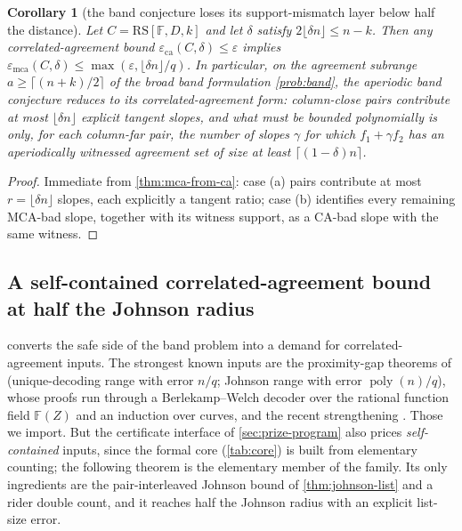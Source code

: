 \documentclass[11pt]{article}
\newtheorem{corollary}[corollary]{Corollary}
\theoremstyle{definition}
\theoremstyle{remark}
\newcommand{\F}{\mathbb{F}}
\newcommand{\RS}{\mathrm{RS}}
\newcommand{\eca}{\varepsilon_{\mathrm{ca}}}
\newcommand{\emca}{\varepsilon_{\mathrm{mca}}}
\begin{document}
\begin{corollary}[the band conjecture loses its support-mismatch layer below half the distance]\label{cor:band-reduction}
Let $C=\RS[\F,D,k]$ and let $\delta$ satisfy $2\lfloor\delta n\rfloor\le n-k$. Then any correlated-agreement bound $\eca(C,\delta)\le\varepsilon$ implies $\emca(C,\delta)\le\max(\varepsilon,\lfloor\delta n\rfloor/q)$. In particular, on the agreement subrange $a\ge\lceil(n+k)/2\rceil$ of the broad band formulation \cref{prob:band}, the aperiodic band conjecture reduces to its correlated-agreement form: column-close pairs contribute at most $\lfloor\delta n\rfloor$ explicit tangent slopes, and what must be bounded polynomially is only, for each column-far pair, the number of slopes $\gamma$ for which $f_1+\gamma f_2$ has an aperiodically witnessed agreement set of size at least $\lceil(1-\delta)n\rceil$.
\end{corollary}

\begin{proof}
Immediate from \cref{thm:mca-from-ca}: case \textup{(a)} pairs contribute at most $r=\lfloor\delta n\rfloor$ slopes, each explicitly a tangent ratio; case \textup{(b)} identifies every remaining MCA-bad slope, together with its witness support, as a CA-bad slope with the same witness.
\end{proof}

\subsection{A self-contained correlated-agreement bound at half the Johnson radius}\label{sec:pincer-ca}

 converts the safe side of the band problem into a demand for correlated-agreement inputs. The strongest known inputs are the proximity-gap theorems of \cite{BCIKS20} (unique-decoding range with error $n/q$; Johnson range with error $\operatorname{poly}(n)/q$), whose proofs run through a Berlekamp--Welch decoder over the rational function field $\F(Z)$ and an induction over curves, and the recent strengthening \cite{BCHKS25}. Those we import. But the certificate interface of \cref{sec:prize-program} also prices \emph{self-contained} inputs, since the formal core (\cref{tab:core}) is built from elementary counting; the following theorem is the elementary member of the family. Its only ingredients are the pair-interleaved Johnson bound of \cref{thm:johnson-list} and a rider double count, and it reaches half the Johnson radius with an explicit list-size error.
\end{document}
